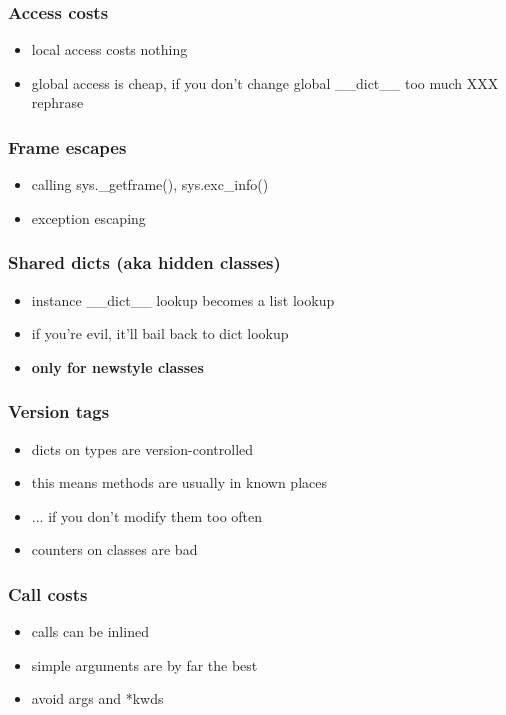 \documentclass[utf8x, 14pt]{beamer}
\begin{document}
\begin{frame}
  \frametitle{Access costs}
  \begin{itemize}
    \item local access costs nothing
    \item global access is cheap, if you don't change global {\ttfamily \_\_dict\_\_} too much XXX rephrase
  \end{itemize}
\end{frame}

\begin{frame}
  \frametitle{Frame escapes}
  \begin{itemize}
    \item calling {\ttfamily sys.\_getframe()}, {\ttfamily sys.exc\_info()}
    \item exception escaping
  \end{itemize}
\end{frame}

\begin{frame}
  \frametitle{Shared dicts (aka hidden classes)}
  \begin{itemize}
    \item instance {\ttfamily \_\_dict\_\_ } lookup becomes a list lookup
    \item if you're evil, it'll bail back to dict lookup
      \pause
    \item {\bf only for newstyle classes}
  \end{itemize}
\end{frame}

\begin{frame}
  \frametitle{Version tags}
  \begin{itemize}
    \item dicts on types are version-controlled
    \item this means methods are usually in known places
      \pause
    \item ... if you don't modify them too often
    \item counters on classes are bad
  \end{itemize}
\end{frame}

\begin{frame}
  \frametitle{Call costs}
  \begin{itemize}
    \item calls can be inlined
    \item simple arguments are by far the best
    \item avoid {\ttfamily *args} and {\ttfamily **kwds}
  \end{itemize}
\end{frame}
\end{document}
